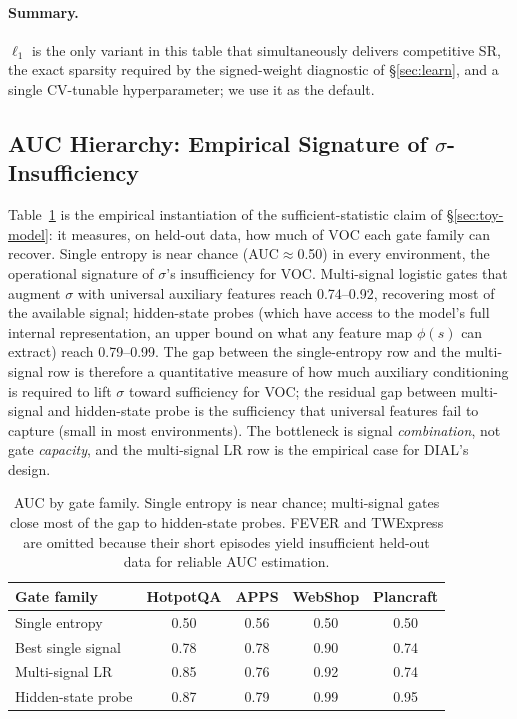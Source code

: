 \paragraph{Summary.}
$\ell_1$ is the only variant in this table that simultaneously
delivers competitive SR, the exact sparsity required by the
signed-weight diagnostic of \S\ref{sec:learn}, and a single
CV-tunable hyperparameter; we use it as the default.

\subsection{AUC Hierarchy: Empirical Signature of $\sigma$-Insufficiency}
\label{app:auc}

Table~\ref{tab:auc-hierarchy} is the empirical instantiation of
the sufficient-statistic claim of \S\ref{sec:toy-model}: it
measures, on held-out data, how much of $\mathrm{VOC}$ each gate
family can recover. Single entropy is near chance
(AUC${\approx}$0.50) in every environment, the operational
signature of $\sigma$'s insufficiency for VOC. Multi-signal
logistic gates that augment $\sigma$ with universal auxiliary
features reach 0.74--0.92, recovering most of the available
signal; hidden-state probes (which have access to the model's
full internal representation, an upper bound on what any feature
map $\phi(s)$ can extract) reach 0.79--0.99. The gap between the
single-entropy row and the multi-signal row is therefore a
quantitative measure of how much auxiliary conditioning is
required to lift $\sigma$ toward sufficiency for VOC; the
residual gap between multi-signal and hidden-state probe is the
sufficiency that universal features fail to capture (small in
most environments). The bottleneck is signal \emph{combination},
not gate \emph{capacity}, and the multi-signal LR row is the
empirical case for DIAL's design.

\begin{table}[H]
\caption{AUC by gate family. Single entropy is near chance;
multi-signal gates close most of the gap to hidden-state probes.
FEVER and TWExpress are omitted because their short episodes
yield insufficient held-out data for reliable AUC estimation.}
\label{tab:auc-hierarchy}
\centering\small
\begin{tabular}{lcccc}
\toprule
Gate family & HotpotQA & APPS & WebShop & Plancraft \\
\midrule
Single entropy      & 0.50 & 0.56 & 0.50 & 0.50 \\
Best single signal  & 0.78 & 0.78 & 0.90 & 0.74 \\
Multi-signal LR     & 0.85 & 0.76 & 0.92 & 0.74 \\
Hidden-state probe  & 0.87 & 0.79 & 0.99 & 0.95 \\
\bottomrule
\end{tabular}
\end{table}

